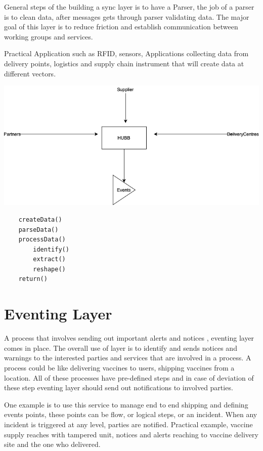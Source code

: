 \documentclass{article}
\begin{document}
General steps of the building a sync layer is to have a Parser, the job of a parser is to clean data, after messages gets through parser validating data. The major goal of this layer is to reduce friction and establish communication between working groups and services.

Practical Application such as RFID, sensors, Applications collecting data from delivery points, logistics and supply chain instrument that will create data at different vectors.

\includegraphics[scale=0.5]{hubb}


\begin{lstlisting}
	createData()
	parseData()
	processData()
		identify()
		extract()
		reshape()
	return()	
\end{lstlisting}

   
\section{Eventing Layer}

A process that involves sending out important alerts and notices	, eventing layer comes in place. The overall use of  layer is to identify and sends notices and warnings to the interested parties and services that are involved in a process. A process could be like delivering vaccines to users, shipping vaccines from a location. All of these processes have pre-defined steps and in case of deviation of these step eventing layer should send out notifications to involved parties.

One example is to use this service to manage end to end shipping and defining events points, these points can be flow, or logical steps, or an incident. When any incident is triggered at any level, parties are notified. Practical example, vaccine supply reaches with tampered unit, notices and alerts reaching to vaccine delivery site and the one who delivered.
\end{document}
